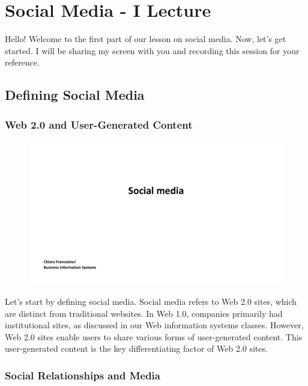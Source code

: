 \section{Social Media - I Lecture}

Hello! Welcome to the first part of our lesson on social media.
Now, let's get started. I will be sharing my screen with you and
recording this session for your reference.

\subsection{Defining Social Media}\label{defining-social-media}

\subsubsection{Web 2.0 and User-Generated
  Content}\label{web-2.0-and-user-generated-content}

\begin{figure}[!h]
  \centering
  \includegraphics[page=2, trim = 1.5cm 7cm 3cm 4cm, clip, width=\imagewidth]{images/04 - Social_Media.pdf}
\end{figure}

Let's start by defining social media. Social media refers to Web 2.0
sites, which are distinct from traditional websites. In Web 1.0,
companies primarily had institutional sites, as discussed in our Web
information systems classes. However, Web 2.0 sites enable users to
share various forms of user-generated content. This user-generated
content is the key differentiating factor of Web 2.0 sites.

\subsubsection{Social Relationships and
  Media}\label{social-relationships-and-media}


